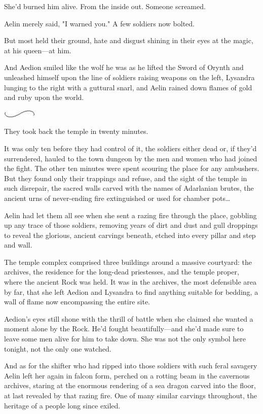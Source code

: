 She'd burned him alive. From the inside out. Someone screamed.

Aelin merely said, "I warned you." A few soldiers now bolted.

But most held their ground, hate and disgust shining in their eyes at the magic, at his queen---at him.

And Aedion smiled like the wolf he was as he lifted the Sword of Orynth and unleashed himself upon the line of soldiers raising weapons on the left, Lysandra lunging to the right with a guttural snarl, and Aelin rained down flames of gold and ruby upon the world.

\includegraphics[width=0.65in,height=0.13in]{images/seperator}

They took back the temple in twenty minutes.

It was only ten before they had control of it, the soldiers either dead or, if they'd surrendered, hauled to the town dungeon by the men and women who had joined the fight. The other ten minutes were spent scouring the place for any ambushers. But they found only their trappings and refuse, and the sight of the temple in such disrepair, the sacred walls carved with the names of Adarlanian brutes, the ancient urns of never-ending fire extinguished or used for chamber pots\ldots{}

Aelin had let them all see when she sent a razing fire through the place, gobbling up any trace of those soldiers, removing years of dirt and dust and gull droppings to reveal the glorious, ancient carvings beneath, etched into every pillar and step and wall.

The temple complex comprised three buildings around a massive courtyard:
the archives, the residence for the long-dead priestesses, and the temple proper, where the ancient Rock was held. It was in the archives, the most defensible area by far, that she left Aedion and Lysandra to find anything suitable for bedding, a wall of flame now encompassing the entire site.

Aedion's eyes still shone with the thrill of battle when she claimed she wanted a moment alone by the Rock. He'd fought beautifully---and she'd made sure to leave some men alive for him to take down. She was not the only symbol here tonight, not the only one watched.

And as for the shifter who had ripped into those soldiers with such feral savagery  Aelin left her again in falcon form, perched on a rotting beam in the cavernous archives, staring at the enormous rendering of a sea dragon carved into the floor, at last revealed by that razing fire. One of many similar carvings throughout, the heritage of a people long since exiled.

